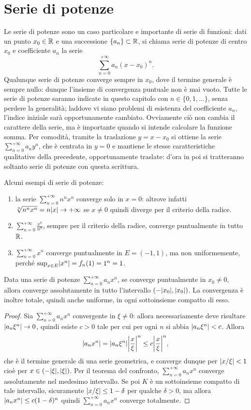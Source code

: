 \section{Serie di potenze}
Le serie di potenze sono un caso particolare e importante di serie di funzioni: dati un punto $x_0\in\R$ e una successione $\{a_n\}\subset\R$, si chiama serie di potenze di centro $x_0$ e coefficiente $a_n$ la serie
\[
\sum_{n=0}^{+\infty}a_n(x-x_0)^n.
\]
Qualunque serie di potenze converge sempre in $x_0$, dove il termine generale è sempre nullo: dunque l'insieme di convergenza puntuale non è mai vuoto.
Tutte le serie di potenze saranno indicate in questo capitolo con $n\in\{0,1,\dots\}$, senza perdere la generalità; laddove vi siano problemi di esistenza del coefficiente $a_n$, l'indice iniziale sarà opportunamente cambiato. Ovviamente ciò non cambia il carattere della serie, ma è importante quando si intende calcolare la funzione somma.
Per comodità, tramite la traslazione $y=x-x_0$ si ottiene la serie $\sum_{n=0}^{+\infty}a_ny^n$, che è centrata in $y=0$ e mantiene le stesse caratteristiche qualitative della precedente, opportunamente traslate: d'ora in poi si tratteranno soltanto serie di potenze con questa scrittura.
\begin{esempio} \label{es:serie-di-potenze}
	Alcuni esempi di serie di potenze:
	\begin{enumerate}
		\item la serie $\sum_{n=0}^{+\infty}n^nx^n$ converge solo in $x=0$: altrove infatti $\sqrt[n]{n^nx^n}=n\abs{x}\to+\infty$ se $x\neq 0$ quindi diverge per il criterio della radice.
		\item $\sum_{n=0}^{+\infty}\frac{x^n}{n^n}$, sempre per il criterio della radice, converge puntualmente in tutto $\R$.
		\item $\sum_{n=0}^{+\infty}x^n$ converge puntualmente in $E=(-1,1)$, ma non uniformemente, perché $\sup_{x\in E}\abs{x^n}=f_n(1)=1^n=1$.
	\end{enumerate}
\end{esempio}
\begin{teorema}
Data una serie di potenze $\sum_{n=0}^{+\infty}a_nx^n$, se converge puntualmente in $x_0\neq 0$, allora converge assolutamente in tutto l'intervallo $(-\abs{x_0},\abs{x_0})$. La convergenza è inoltre totale, quindi anche uniforme, in ogni sottoinsieme compatto di esso.
\end{teorema}
\begin{proof}
Sia $\sum_{n=0}^{+\infty}a_nx^n$ convergente in $\xi\neq 0$: allora necessariamente deve risultare $\abs{a_n\xi^n}\to 0$, quindi esiste $c>0$ tale per cui per ogni $n$ si abbia $\abs{a_n\xi^n}<c$. Allora
\[
	\abs{a_nx^n}=\abs{a_n\xi^n}\abs[\bigg]{\frac{x}{\xi}}^n\leq c\abs[\bigg]{\frac{x}{\xi}}^n,
\]
che è il termine generale di una serie geometrica, e converge dunque per $\abs{x/\xi}<1$ cioè per $x\in(-\abs{\xi},\abs{\xi})$. Per il teorema del confronto, $\sum_{n=0}^{+\infty}a_nx^n$ converge assolutamente nel medesimo intervallo.
Se poi $K$ è un sottoinsieme compatto di tale intervallo, sicuramente $\abs{x/\xi}\leq 1-\delta$ per qualche $\delta>0$, ma allora $\abs{a_nx^n}\leq c(1-\delta)^n$ quindi $\sum_{n=0}^{+\infty}a_nx^n$ converge totalmente.
\end{proof}
